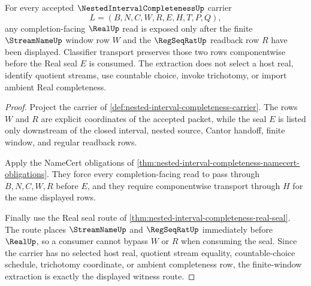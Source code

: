 \begin{theorem}
\label{thm:nested-interval-completeness-window-extraction}
For every accepted $\NestedIntervalCompletenessUp$ carrier
$$
L=(B,N,C,W,R,E,H,T,P,Q),
$$
any completion-facing $\RealUp$ read is exposed only after the finite $\StreamNameUp$ window row $W$ and the $\RegSeqRatUp$ readback row $R$ have been displayed. Classifier transport preserves those two rows componentwise before the Real seal $E$ is consumed. The extraction does not select a host real, identify quotient streams, use countable choice, invoke trichotomy, or import ambient Real completeness.
\end{theorem}
\begin{proof}
Project the carrier of \autoref{def:nested-interval-completeness-carrier}. The rows $W$ and $R$ are explicit coordinates of the accepted packet, while the seal $E$ is listed only downstream of the closed interval, nested source, Cantor handoff, finite window, and regular readback rows.

Apply the NameCert obligations of \autoref{thm:nested-interval-completeness-namecert-obligations}. They force every completion-facing read to pass through $B,N,C,W,R$ before $E$, and they require componentwise transport through $H$ for the same displayed rows.

Finally use the Real seal route of \autoref{thm:nested-interval-completeness-real-seal}. The route places $\StreamNameUp$ and $\RegSeqRatUp$ immediately before $\RealUp$, so a consumer cannot bypass $W$ or $R$ when consuming the seal. Since the carrier has no selected host real, quotient stream equality, countable-choice schedule, trichotomy coordinate, or ambient completeness row, the finite-window extraction is exactly the displayed witness route.
\end{proof}


